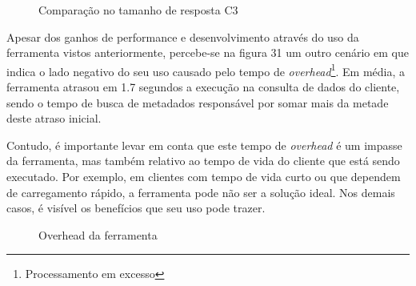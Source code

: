 \begin{figure}[H]
  \centering
  \caption{Comparação no tamanho de resposta C3}
\end{figure}

Apesar dos ganhos de performance e desenvolvimento através do uso da ferramenta vistos anteriormente, percebe-se na figura 31 um outro cenário em que indica o lado negativo do seu uso causado pelo tempo de \textit{overhead}\footnote{
  Processamento em excesso
}. Em média, a ferramenta atrasou em 1.7 segundos a execução na consulta de dados do cliente, sendo o tempo de busca de metadados responsável por somar mais da metade deste atraso inicial.

Contudo, é importante levar em conta que este tempo de \textit{overhead} é um impasse da ferramenta, mas também relativo ao tempo de vida do cliente que está sendo executado. Por exemplo, em clientes com tempo de vida curto ou que dependem de carregamento rápido, a ferramenta pode não ser a solução ideal. Nos demais casos, é visível os benefícios que seu uso pode trazer.

\begin{figure}[H]
  \centering
  \caption{Overhead da ferramenta}
\end{figure}
